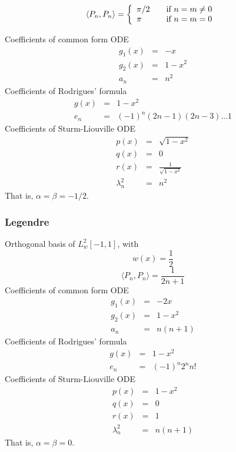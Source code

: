 \documentclass[oneside,a4paper,11pt]{article}
\begin{document}
\[\langle P_n,P_n\rangle = \left\{ 
  \begin{array}{l l}
    \pi/2 & \quad \text{if $n = m \neq 0$ }\\
    \pi & \quad \text{if $n=m=0$ }
  \end{array} \right.\]
  
Coefficients of common form ODE
\begin{eqnarray*}
g_1(x) &=& -x\\
g_2(x) &=& 1 - x^2\\
a_n &=& n^2
\end{eqnarray*}
Coefficients of Rodrigues' formula
 \begin{eqnarray*}
g(x) &=& 1 - x^2\\
e_n &=& (-1)^n(2n-1)(2n-3)...1
\end{eqnarray*}
Coefficients of Sturm-Liouville ODE
\begin{eqnarray*}
p(x) &=& \sqrt{1 - x^2}\\
q(x) &=& 0\\
r(x) &=& \frac{1}{\sqrt{1 - x^2}}\\
\lambda^2_n &=& n^2
\end{eqnarray*}
That is, $\alpha = \beta = -1/2$.

\subsubsection{Legendre}
Orthogonal basis of $L^2_w[-1,1]$, with
\[w(x) = \frac{1}{2}\] 
\[\langle P_n,P_n\rangle = \frac{1}{2n+1}\]
Coefficients of common form ODE
\begin{eqnarray*}
g_1(x) &=& -2x\\
g_2(x) &=& 1 - x^2\\
a_n &=& n(n+1)
\end{eqnarray*}
Coefficients of Rodrigues' formula
 \begin{eqnarray*}
g(x) &=& 1 - x^2\\
e_n &=& (-1)^n2^nn!
\end{eqnarray*}
Coefficients of Sturm-Liouville ODE
\begin{eqnarray*}
p(x) &=& 1 - x^2\\
q(x) &=& 0\\
r(x) &=& 1\\
\lambda^2_n &=& n(n+1)
\end{eqnarray*}
That is, $\alpha = \beta = 0$.
\end{document}
